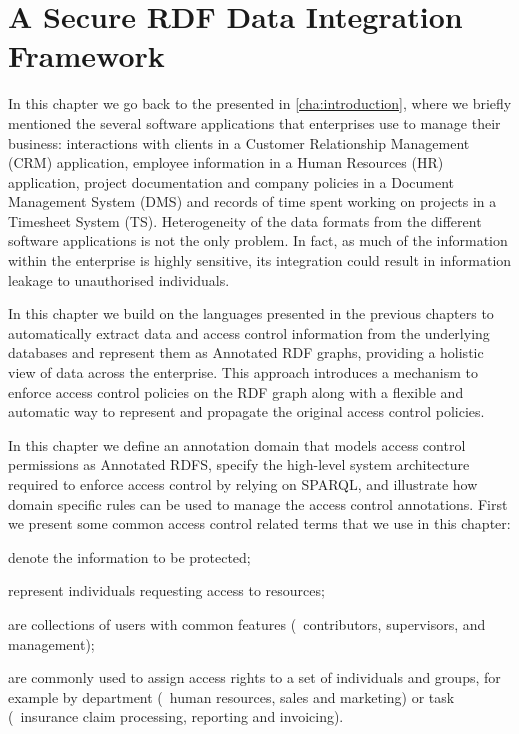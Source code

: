 \chapter{A Secure RDF Data Integration Framework}
\label{cha:usecase}

In this chapter we go back to the \usecase presented in \cref{cha:introduction}, where we briefly mentioned the several
software applications that enterprises use to manage their business: interactions with clients in a Customer
Relationship Management (CRM) application, employee information in a Human Resources (HR) application, project
documentation and company policies in a Document Management System (DMS) and records of time spent working on projects
in a Timesheet System (TS).
%
Heterogeneity of the data formats from the different software applications is not the only problem. In fact, as much of
the information within the enterprise is highly sensitive, its integration could result in information leakage to
unauthorised individuals.

In this chapter we build on the languages presented in the previous chapters to automatically extract data and access
control information from the underlying databases and represent them as Annotated \ac{RDF} graphs, providing a holistic
view of data across the enterprise. 
%
This approach introduces a mechanism to enforce access control policies on the \ac{RDF} graph along with a flexible and
automatic way to represent and propagate the original access control policies.

In this chapter we define an annotation domain that models access control permissions as Annotated RDFS, specify the
high-level system architecture required to enforce access control by relying on SPARQL, and illustrate how domain
specific rules can be used to manage the access control annotations.
%
First we present some common access control related terms that we use in this chapter:
%
\begin{description}[noitemsep]
\item[Resources] denote the information to be protected;
\item[Users] represent individuals requesting access to resources;
\item[Groups] are collections of users with common features (\eg~contributors, supervisors, and management);
\item[Roles] are commonly used to assign access rights to a set of individuals and groups, for example by department
  (\eg~human resources, sales and marketing) or task (\eg~insurance claim processing, reporting and invoicing).
\end{description}


